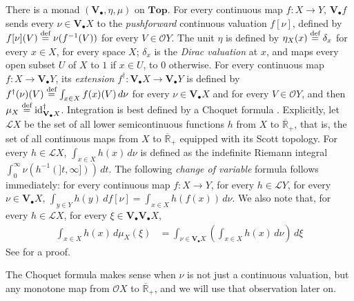\documentclass[preprint,12pt]{elsarticle}
\newcommand\eqdef{\mathrel{\buildrel \text{def}\over=}}
\newcommand{\creal}{\overline{\mathbb{R}}_+}
\newcommand\Lform{\mathcal L}
\newcommand\identity[1]{\mathrm{id}_{#1}}
\newcommand\Val{{\mathbf V}}
\newcommand\Open{{\mathcal O}}
\newcommand\Topcat{\mathbf{Top}}
\begin{document}
There is a monad $(\Val_\bullet, \eta, \mu)$ on $\Topcat$.  For every
continuous map $f \colon X \to Y$, $\Val_\bullet f$ sends every
$\nu \in \Val_\bullet X$ to the \emph{pushforward} continuous
valuation $f [\nu]$, defined by $f [\nu] (V) \eqdef \nu (f^{-1} (V))$
for every $V \in \Open Y$.  The unit $\eta$ is defined by
$\eta_X (x) \eqdef \delta_x$ for every $x \in X$, for every space $X$;
$\delta_x$ is the \emph{Dirac valuation} at $x$, and maps every open
subset $U$ of $X$ to $1$ if $x \in U$, to $0$ otherwise.  For every
continuous map $f \colon X \to \Val_\bullet Y$, its \emph{extension}
$f^\dagger \colon \Val_\bullet X \to \Val_\bullet Y$ is defined by
$f^\dagger (\nu) (V) \eqdef \int_{x \in X} f (x) (V) \,d\nu$ for every
$\nu \in \Val_\bullet X$ and for every $V \in \Open Y$, and then
$\mu_X \eqdef \identity {\Val_\bullet X}^\dagger$.  Integration is
best defined by a Choquet formula \cite[Section~4]{Tix:bewertung}.
Explicitly, let $\Lform X$ be the set of all lower semicontinuous
functions $h$ from $X$ to $\creal$, that is, the set of all continuous
maps from $X$ to $\creal$ equipped with its Scott topology.  For every
$h \in \Lform X$, $\int_{x \in X} h (x) \,d\nu$ is defined as the
indefinite Riemann integral
$\int_0^\infty \nu (h^{-1} (]t, \infty])) \,dt$.  The following
\emph{change of variable} formula follows immediately: for every
continuous map $f \colon X \to Y$, for every $h \in \Lform Y$, for
every $\nu \in \Val_\bullet X$,
$\int_{y \in Y} h (y) \,df[\nu] = \int_{x \in X} h (f (x)) \,d\nu$.
We also note that, for every $h \in \Lform X$, for every $\xi \in
\Val_\bullet {\Val_\bullet X}$,
\begin{align*}
  \int_{x \in X} h (x) \,d\mu_X (\xi)
  & = \int_{\nu \in \Val_\bullet X}
    \left(\int_{x \in X} h (x) \,d\nu\right)\,d\xi
\end{align*}
See \cite[Hilfssatz~6.1]{kirch93} for a proof.

The Choquet formula makes sense when $\nu$ is not just a continuous
valuation, but any monotone map from $\Open X$ to $\creal$, and we
will use that observation later on.
\end{document}
